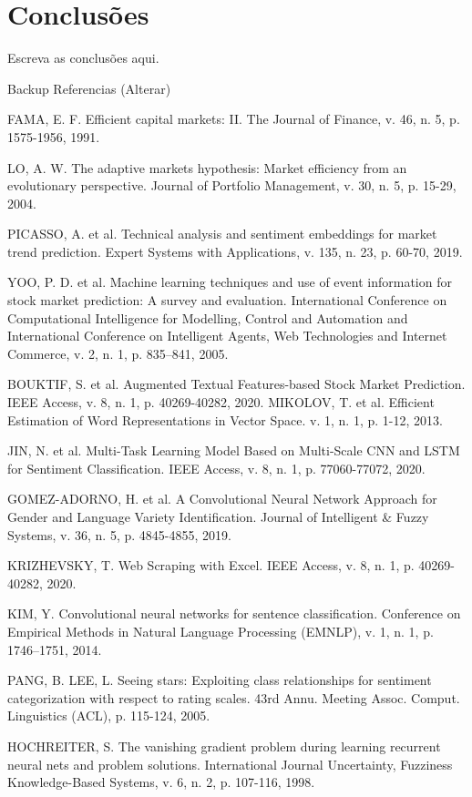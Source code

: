 \chapter{Conclusões}

{\color{red}
Escreva as conclusões aqui.
}


Backup Referencias (Alterar)

FAMA, E. F. Efficient capital markets: II. The Journal of Finance, v. 46, n. 5, p. 1575-1956, 1991. 

LO, A. W. The adaptive markets hypothesis: Market efficiency from an evolutionary perspective. Journal of Portfolio Management, v. 30, n. 5, p. 15-29, 2004.

PICASSO, A. et al. Technical analysis and sentiment embeddings for market trend prediction. Expert Systems with Applications, v. 135, n. 23, p. 60-70, 2019. 

YOO, P. D. et al. Machine learning techniques and use of event information for stock market prediction: A survey and evaluation. International Conference on Computational Intelligence for Modelling, Control and Automation and International Conference on Intelligent Agents, Web Technologies and Internet Commerce, v. 2, n. 1, p. 835–841, 2005.

BOUKTIF, S. et al. Augmented Textual Features-based Stock Market Prediction. IEEE Access, v. 8, n. 1, p. 40269-40282, 2020.
MIKOLOV, T. et al. Efficient Estimation of Word Representations in Vector Space. v. 1, n. 1, p. 1-12, 2013.

JIN, N. et al. Multi-Task Learning Model Based on Multi-Scale CNN and LSTM for Sentiment Classification. IEEE Access, v. 8, n. 1, p. 77060-77072, 2020.

GOMEZ-ADORNO, H. et al. A Convolutional Neural Network Approach for Gender and Language Variety Identification. Journal of Intelligent & Fuzzy Systems, v. 36, n. 5, p. 4845-4855, 2019.

KRIZHEVSKY, T. Web Scraping with Excel. IEEE Access, v. 8, n. 1, p. 40269-40282, 2020.

KIM, Y. Convolutional neural networks for sentence classification. Conference on Empirical Methods in Natural Language Processing (EMNLP), v. 1, n. 1, p. 1746–1751, 2014.

PANG, B. LEE, L. Seeing stars: Exploiting class relationships for sentiment categorization with respect to rating scales. 43rd Annu. Meeting Assoc. Comput. Linguistics (ACL), p. 115-124, 2005.

HOCHREITER, S. The vanishing gradient problem during learning recurrent neural nets and problem solutions. International Journal Uncertainty, Fuzziness Knowledge-Based Systems, v. 6, n. 2, p. 107-116, 1998.

